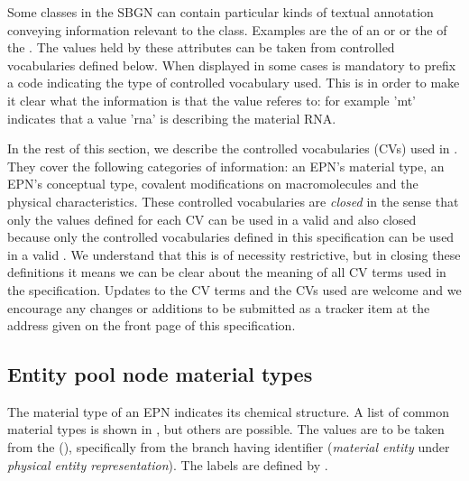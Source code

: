 
Some classes in the SBGN \PDl can contain particular kinds of textual
annotation conveying information relevant to the class.  Examples are
the  of an  or
 or the  of the
. The values held by these attributes can be
taken from controlled vocabularies defined below. When displayed in
some cases is mandatory to prefix a code indicating the type of
controlled vocabulary used.  This is in order to make it clear what
the information is that the value referes to: for example 'mt'
indicates that a value 'rna' is describing the material RNA.

In the rest of this section, we describe the controlled vocabularies
(CVs) used in \SBGNPDLone.  They cover the following categories of
information: an EPN's material type, an EPN's conceptual type,
covalent modifications on macromolecules and the physical
characteristics. These controlled vocabularies are \emph{closed} in
the sense that only the values defined for each CV can be used in a
valid \PDm and also closed because only the controlled vocabularies
defined in this specification can be used in a valid \PDm{}. We
understand that this is of necessity restrictive, but in closing these
definitions it means we can be clear about the meaning of all CV terms
used in the specification. Updates to the CV terms and the CVs used
are welcome and we encourage any changes or additions to be submitted
as a tracker item at the address given on the front page of this
specification.


\subsection{Entity pool node material types}
\label{sec:material-types-cv}

The material type of an EPN indicates its chemical structure.  A list
of common material types is shown in , but
others are possible.  The values are to be taken from the \sbo
(\sbourl), specifically from the branch having identifier
 ($\!$\emph{material entity} under \emph{physical entity representation}).
The labels are defined by \SBGNPDLone.

